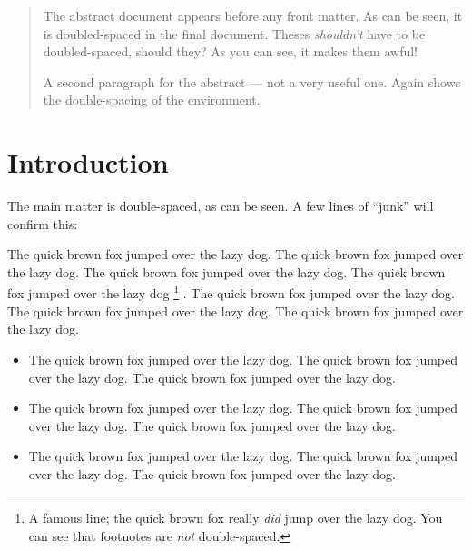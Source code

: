 \documentclass{unswthesis}
\begin{document}

\frontmatter
\maketitle

\begin{abstract}
The abstract document appears before any front matter.  As can be seen, it
is doubled-spaced in the final document.  Theses \emph{shouldn't} have to be
doubled-spaced, should they?  As you can see, it makes them awful!

A second paragraph for the abstract --- not a very useful one. Again shows
the double-spacing of the environment.
\end{abstract}

\tableofcontents
\listoffigures
\listoftables


\mainmatter

\chapter{Introduction}

The main matter is double-spaced, as can be seen. A few lines of ``junk''
will confirm this:

The quick brown fox jumped over the lazy dog.  The quick brown fox jumped
over the lazy dog.  The quick brown fox jumped over the lazy dog.  The quick
brown fox jumped over the lazy dog%
%
\footnote{A famous line; the quick brown fox really \emph{did} jump over the
lazy dog. You can see that footnotes are \emph{not} double-spaced.}%
%
.
The quick brown fox jumped over the lazy dog.  The quick brown fox jumped
over the lazy dog.  The quick brown fox jumped over the lazy dog.
%
\begin{itemize}
    \item The quick brown fox jumped over the lazy dog.  The quick brown fox
	  jumped over the lazy dog.  The quick brown fox jumped over the
	  lazy dog.
    \item The quick brown fox jumped over the lazy dog.  The quick brown fox
	  jumped over the lazy dog.  The quick brown fox jumped over the
	  lazy dog.
    \item The quick brown fox jumped over the lazy dog.  The quick brown fox
	  jumped over the lazy dog.  The quick brown fox jumped over the
	  lazy dog.
\end{itemize}
\end{document}

